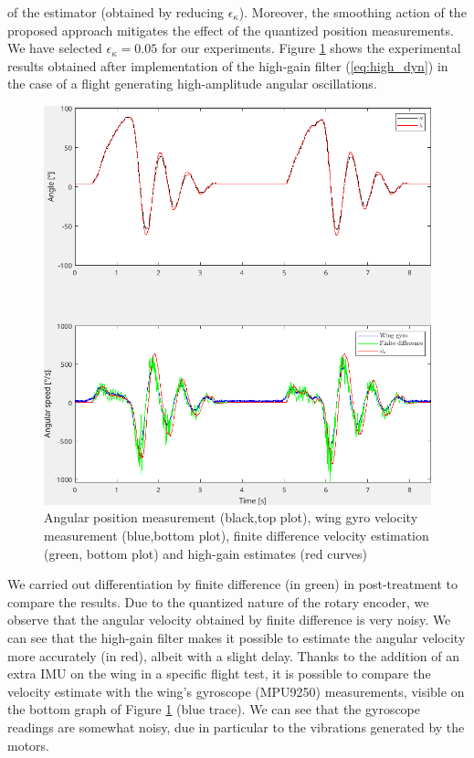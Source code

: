 of the estimator (obtained by reducing $\epsilon_{\kappa}$). Moreover, the smoothing action of the proposed approach mitigates the effect of the quantized position measurements. We have selected $\epsilon_{\kappa} = 0.05$ for our experiments. Figure \ref{fig:high_gain} shows the experimental results obtained after implementation of the high-gain filter (\ref{eq:high_dyn}) in the case of a flight generating high-amplitude angular oscillations.
\begin{figure}[h]
\centering
    \includegraphics[width=1\columnwidth,angle=0]{figures/highGainFilter.png}
    \caption{Angular position measurement (black,top plot), wing gyro velocity measurement (blue,bottom plot), finite difference velocity estimation (green, bottom plot) and high-gain estimates (red curves)}
    \label{fig:high_gain}
\end{figure}
We carried out differentiation by finite difference (in green) in post-treatment to compare the results. Due to the quantized nature of the rotary encoder, we observe that the angular velocity obtained by finite difference is very noisy. We can see that the high-gain filter makes it possible to estimate the angular velocity more accurately (in red), albeit with a slight delay. Thanks to the addition of an extra IMU on the wing in a specific flight test, it is possible to compare the velocity estimate with the wing's gyroscope (MPU9250) measurements, visible on the bottom graph of Figure \ref{fig:high_gain} (blue trace). We can see that the gyroscope readings are somewhat noisy, due in particular to the vibrations generated by the motors.  %
